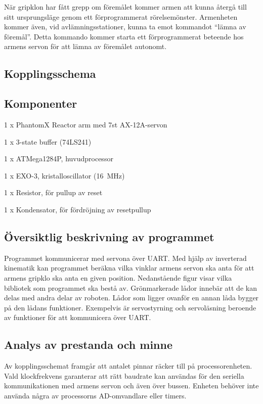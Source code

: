 När gripklon har fått grepp om föremålet kommer armen att kunna återgå till sitt ursprungsläge genom ett förprogrammerat rörelsemönster. Armenheten kommer även, vid avlämningsstationer, kunna ta emot kommandot “lämna av föremål”. Detta kommando kommer starta ett förprogrammerat beteende hos armens servon för att lämna av föremålet autonomt. 


\subsection{Kopplingsschema}


\subsection{Komponenter}

\begin{packed_itemize}
\item 1 x PhantomX Reactor arm med 7st AX-12A-servon
\item 1 x 3-state buffer (74LS241)
\item 1 x ATMega1284P, huvudprocessor
\item 1 x EXO-3, kristalloscillator (16~MHz)
\item 1 x Resistor, för pullup av reset
\item 1 x Kondensator, för fördröjning av resetpullup
\end{packed_itemize}


\subsection{Översiktlig beskrivning av programmet}

Programmet kommunicerar med servona över UART. Med hjälp av inverterad kinematik kan programmet beräkna vilka vinklar armens servon ska anta för att armens gripklo ska anta en given position. Nedanstående figur visar vilka bibliotek som programmet ska bestå av. Grönmarkerade lådor innebär att de kan delas med andra delar av roboten. Lådor som ligger ovanför en annan låda bygger på den lådans funktioner. Exempelvis är servostyrning och servoläsning beroende av funktioner för att kommunicera över UART.



\subsection{Analys av prestanda och minne}

Av kopplingsschemat framgår att antalet pinnar räcker till på processorenheten. Vald klockfrekvens garanterar att rätt baudrate kan användas för den seriella kommunikationen med armens servon och även över bussen.
Enheten behöver inte använda några av processorns AD-omvandlare eller timers.
